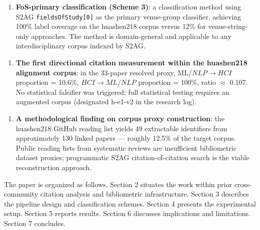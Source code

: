 \begin{enumerate}
\item \textbf{FoS-primary classification (Scheme 3)}: a classification method using S2AG \texttt{fieldsOfStudy[0]} as the primary venue-group classifier, achieving 100\% label coverage on the huashen218 corpus versus 12\% for venue-string-only approaches. The method is domain-general and applicable to any interdisciplinary corpus indexed by S2AG.
\end{enumerate}

\begin{enumerate}
\item \textbf{The first directional citation measurement within the huashen218 alignment corpus}: in the 33-paper resolved proxy, ML/$NLP\rightarrow HCI$ proportion = 10.6\%, $HCI\rightarrow ML/NLP$ proportion = 100\%, ratio $\approx$ 0.107. No statistical falsifier was triggered; full statistical testing requires an augmented corpus (designated h-e1-v2 in the research log).
\end{enumerate}

\begin{enumerate}
\item \textbf{A methodological finding on corpus proxy construction}: the huashen218 GitHub reading list yields 49 extractable identifiers from approximately 130 linked papers --- roughly 12.5\% of the target corpus. Public reading lists from systematic reviews are insufficient bibliometric dataset proxies; programmatic S2AG citation-of-citation search is the viable reconstruction approach.
\end{enumerate}

The paper is organized as follows. Section 2 situates the work within prior cross-community citation analysis and bibliometric infrastructure. Section 3 describes the pipeline design and classification schemes. Section 4 presents the experimental setup. Section 5 reports results. Section 6 discusses implications and limitations. Section 7 concludes.

